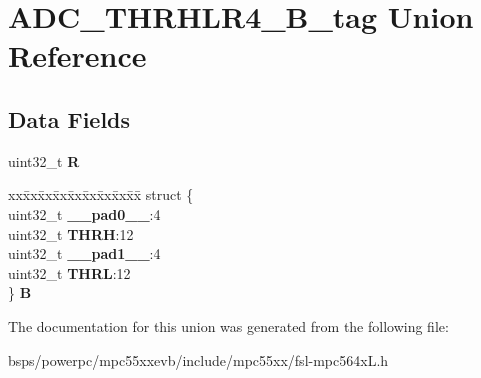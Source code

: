 \hypertarget{unionADC__THRHLR4__32B__tag}{}\section{A\+D\+C\+\_\+\+T\+H\+R\+H\+L\+R4\+\_\+B\+\_\+tag Union Reference}
\label{unionADC__THRHLR4__32B__tag}
\subsection*{Data Fields}
\begin{DoxyCompactItemize}
\item 
\mbox{\label{unionADC__THRHLR4__32B__tag_a42420ce25c92ccb6889501431a90831c}} 
uint32\+\_\+t {\bfseries R}
\item 
\mbox{\label{unionADC__THRHLR4__32B__tag_a3b8a8aad538ed384ce373b519ef1544f}} 
\begin{tabbing}
xx\=xx\=xx\=xx\=xx\=xx\=xx\=xx\=xx\=\kill
struct \{\\
\>uint32\_t {\bfseries \_\_pad0\_\_}:4\\
\>uint32\_t {\bfseries THRH}:12\\
\>uint32\_t {\bfseries \_\_pad1\_\_}:4\\
\>uint32\_t {\bfseries THRL}:12\\
\} {\bfseries B}\\

\end{tabbing}\end{DoxyCompactItemize}


The documentation for this union was generated from the following file\+:\begin{DoxyCompactItemize}
\item 
bsps/powerpc/mpc55xxevb/include/mpc55xx/fsl-\/mpc564x\+L.\+h\end{DoxyCompactItemize}
